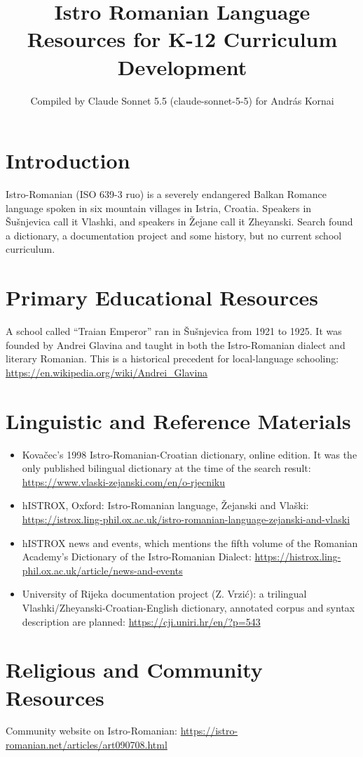 \documentclass[12pt]{article}
\title{Istro Romanian Language Resources for K-12 Curriculum Development}
\author{Compiled by Claude Sonnet 5.5 (claude-sonnet-5-5) for Andr\'as Kornai}
\date{}
\begin{document}
\maketitle

\section{Introduction}
Istro-Romanian (ISO 639-3 ruo) is a severely endangered Balkan Romance language spoken in six mountain villages in Istria, Croatia. Speakers in \v{S}u\v{s}njevica call it Vlashki, and speakers in \v{Z}ejane call it Zheyanski. Search found a dictionary, a documentation project and some history, but no current school curriculum.

\section{Primary Educational Resources}
A school called ``Traian Emperor'' ran in \v{S}u\v{s}njevica from 1921 to 1925. It was founded by Andrei Glavina and taught in both the Istro-Romanian dialect and literary Romanian. This is a historical precedent for local-language schooling: \url{https://en.wikipedia.org/wiki/Andrei_Glavina}

\section{Linguistic and Reference Materials}
\begin{itemize}
\item Kova\v{c}ec's 1998 Istro-Romanian-Croatian dictionary, online edition. It was the only published bilingual dictionary at the time of the search result: \url{https://www.vlaski-zejanski.com/en/o-rjecniku}
\item hISTROX, Oxford: Istro-Romanian language, \v{Z}ejanski and Vlaški: \url{https://istrox.ling-phil.ox.ac.uk/istro-romanian-language-zejanski-and-vlaski}
\item hISTROX news and events, which mentions the fifth volume of the Romanian Academy's Dictionary of the Istro-Romanian Dialect: \url{https://histrox.ling-phil.ox.ac.uk/article/news-and-events}
\item University of Rijeka documentation project (Z. Vrzi\'c): a trilingual Vlashki/Zheyanski-Croatian-English dictionary, annotated corpus and syntax description are planned: \url{https://cji.uniri.hr/en/?p=543}
\end{itemize}

\section{Religious and Community Resources}
Community website on Istro-Romanian: \url{https://istro-romanian.net/articles/art090708.html}
\end{document}
